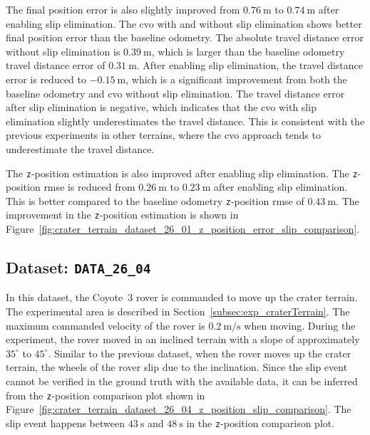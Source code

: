 \documentclass[report.tex]{subfiles}
\begin{document}
    The final position error is also slightly improved from $0.76~\mathrm{m}$ to $0.74~\mathrm{m}$ after enabling slip elimination. The \gls{cvo} with and without slip elimination shows better final position error than the baseline odometry. The absolute travel distance error without slip elimination is $0.39~\mathrm{m}$, which is larger than the baseline odometry travel distance error of $0.31~\mathrm{m}$. After enabling slip elimination, the travel distance error is reduced to $-0.15~\mathrm{m}$, which is a significant improvement from both the baseline odometry and \gls{cvo} without slip elimination. The travel distance error after slip elimination is negative, which indicates that the \gls{cvo} with slip elimination slightly underestimates the travel distance. This is consistent with the previous experiments in other terrains, where the \gls{cvo} approach tends to underestimate the travel distance. 
    
    The \texttt{z}-position estimation is also improved after enabling slip elimination. The \texttt{z}-position \gls{rmse} is reduced from $0.26~\mathrm{m}$ to $0.23~\mathrm{m}$ after enabling slip elimination. This is better compared to the baseline odometry \texttt{z}-position \gls{rmse} of $0.43~\mathrm{m}$. The improvement in the \texttt{z}-position estimation is shown in Figure~\ref{fig:crater_terrain_dataset_26_01_z_position_error_slip_comparison}. 
    \FloatBarrier
            
    \subsection{Dataset: \texttt{DATA\_26\_04}}
    

    In this dataset, the Coyote~3 rover is commanded to move up the crater terrain. The experimental area is described in Section~\ref{subsec:exp_craterTerrain}. The maximum commanded velocity of the rover is $0.2~\mathrm{m/s}$ when moving. During the experiment, the rover moved in an inclined terrain with a slope of approximately $35^{\circ}$ to $45^{\circ}$. Similar to the previous dataset, when the rover moves up the crater terrain, the wheels of the rover slip due to the inclination. Since the slip event cannot be verified in the ground truth with the available data, it can be inferred from the \texttt{z}-position comparison plot shown in Figure~\ref{fig:crater_terrain_dataset_26_04_z_position_slip_comparison}. The slip event happens between $43~\mathrm{s}$ and $48~\mathrm{s}$ in the \texttt{z}-position comparison plot. 
    
\end{document}
